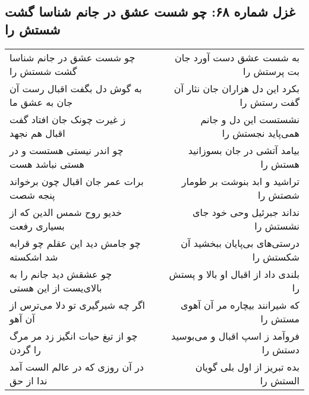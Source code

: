 \begin{center}
\section*{غزل شماره ۶۸: چو شست عشق در جانم شناسا گشت شستش را}
\label{sec:0068}
\begin{longtable}{l p{0.5cm} r}
چو شست عشق در جانم شناسا گشت شستش را
&&
به شست عشق دست آورد جان بت پرستش را
\\
به گوش دل بگفت اقبال رست آن جان به عشق ما
&&
بکرد این دل هزاران جان نثار آن گفت رستش را
\\
ز غیرت چونک جان افتاد گفت اقبال هم نجهد
&&
نشستست این دل و جانم همی‌پاید نجستش را
\\
چو اندر نیستی هستست و در هستی نباشد هست
&&
بیامد آتشی در جان بسوزانید هستش را
\\
برات عمر جان اقبال چون برخواند پنجه شصت
&&
تراشید و ابد بنوشت بر طومار شصتش را
\\
خدیو روح شمس الدین که از بسیاری رفعت
&&
نداند جبرئیل وحی خود جای نشستش را
\\
چو جامش دید این عقلم چو قرابه شد اشکسته
&&
درستی‌های بی‌پایان ببخشید آن شکستش را
\\
چو عشقش دید جانم را به بالای‌یست از این هستی
&&
بلندی داد از اقبال او بالا و پستش را
\\
اگر چه شیرگیری تو دلا می‌ترس از آن آهو
&&
که شیرانند بیچاره مر آن آهوی مستش را
\\
چو از تیغ حیات انگیز زد مر مرگ را گردن
&&
فروآمد ز اسپ اقبال و می‌بوسید دستش را
\\
در آن روزی که در عالم الست آمد ندا از حق
&&
بده تبریز از اول بلی گویان الستش را
\\
\end{longtable}
\end{center}
